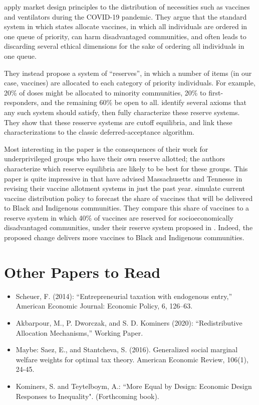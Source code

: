 \documentclass[JEL]{AEA}
\begin{document}
\cite{pathak-2020} apply market design principles to the distribution of necessities such as vaccines and ventilators during the COVID-19 pandemic. They argue that the standard system in which states allocate vaccines, in which all individuals are ordered in one queue of priority, can harm disadvantaged communities, and often leads to discarding several ethical dimensions for the sake of ordering all individuals in one queue.

They instead propose a system of ``reserves'', in which a number of items (in our case, vaccines) are allocated to each category of priority individuals. For example, 20\% of doses might be allocated to minority communities, 20\% to first-responders, and the remaining 60\% be open to all. \cite{pathak-2020}  identify several axioms that any such system should satisfy, then fully characterize these reserve systems. They show that these resserve systems are cutoff equilibria, and link these characterizations to the classic deferred-acceptance algorithm. 

Most interesting in the paper is the consequences of their work for underprivileged groups who have their own reserve allotted; the authors characterize which reserve equilibria are likely to be best for these groups. This paper is quite impressive in that \cite{pathak-2020} have advised Massachusetts and Tennesse in revising their vaccine allotment systems in just the past year. \cite{pathak-2020b} simulate current vaccine distribution policy to forecast the share of vaccines that will be delivered to Black and Indigenous communities. They compare this share of vaccines to a reserve system in which 40\% of vaccines are reserved for socioeconomically disadvantaged communities, under their reserve system proposed in \cite{pathak-2020}. Indeed, the proposed change delivers more vaccines to Black and Indigenous communities.  

\section{Other Papers to Read}

\begin{itemize}
    \item Scheuer, F. (2014): “Entrepreneurial taxation with endogenous entry,” American Economic Journal: Economic Policy, 6, 126–63.
        
    \item Akbarpour, M., P. Dworczak, and S. D. Kominers (2020): “Redistributive Allocation Mechanisms,” Working Paper. %
    
    \item Maybe: Saez, E., and Stantcheva, S. (2016). Generalized social marginal welfare weights for optimal tax theory. American Economic Review, 106(1), 24-45.
    
    \item Kominers, S. and Teytelboym, A.: ``More Equal by Design: Economic Design Responses to Inequality". (Forthcoming book).

\end{itemize}
\end{document}
